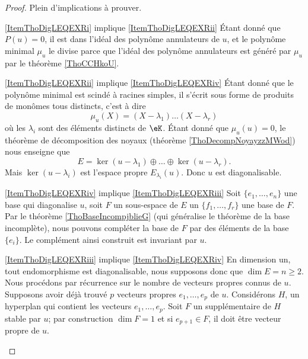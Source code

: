 \begin{proof}
    Plein d'implications à prouver.
    \begin{subproof}
    \item[\ref{ItemThoDigLEQEXRi} implique \ref{ItemThoDigLEQEXRii}] Étant donné que \( P(u)=0\), il est dans l'idéal des polynôme annulateurs de \( u\), et le polynôme minimal \( \mu_u\) le divise parce que l'idéal des polynôme annulateurs est généré par \( \mu_u\) par le théorème \ref{ThoCCHkoU}.

    \item[\ref{ItemThoDigLEQEXRii} implique \ref{ItemThoDigLEQEXRiv}] Étant donné que le polynôme minimal est scindé à racines simples, il s'écrit sous forme de produits de monômes tous distincts, c'est à dire
    \begin{equation}
        \mu_u(X)=(X-\lambda_1)\ldots(X-\lambda_r)
    \end{equation}
    où les \( \lambda_i\) sont des éléments distincts de \( \eK\). Étant donné que \( \mu_u(u)=0\), le théorème de décomposition des noyaux (théorème \ref{ThoDecompNoyayzzMWod}) nous enseigne que
    \begin{equation}
        E=\ker(u-\lambda_1)\oplus\ldots\oplus\ker(u-\lambda_r).
    \end{equation}
    Mais \( \ker(u-\lambda_i)\) est l'espace propre \( E_{\lambda_i}(u)\). Donc \( u\) est diagonalisable.

\item[\ref{ItemThoDigLEQEXRiv} implique \ref{ItemThoDigLEQEXRiii}] Soit \( \{ e_1,\ldots, e_n \}\) une base qui diagonalise \( u\), soit \( F\) un sous-espace de \( E\) un \( \{ f_1,\ldots, f_r \}\) une base de \( F\). Par le théorème \ref{ThoBaseIncompjblieG} (qui généralise le théorème de la base incomplète), nous pouvons compléter la base de \( F\) par des éléments de la base \( \{ e_i \}\). Le complément ainsi construit est invariant par \( u\).

\item[\ref{ItemThoDigLEQEXRiii} implique \ref{ItemThoDigLEQEXRiv}] En dimension un, tout endomorphisme est diagonalisable, nous supposons donc que \( \dim E=n\geq 2\). Nous procédons par récurrence sur le nombre de vecteurs propres connus de \( u\). Supposons avoir déjà trouvé \( p\) vecteurs propres \( e_1,\ldots, e_p\) de \( u\). Considérons \( H\), un hyperplan qui contient les vecteurs \( e_1,\ldots, e_p\). Soit \( F\) un supplémentaire de \( H\) stable par \( u\); par construction \( \dim F=1\) et si \( e_{p+1}\in F\), il doit être vecteur propre de \( u\).


\end{subproof}
\end{proof}
